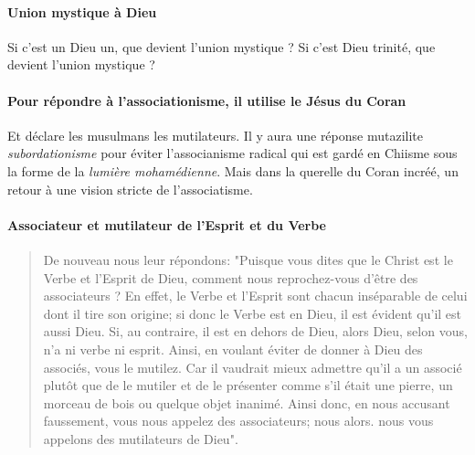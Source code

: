 \paragraph{Union mystique à Dieu} Si c'est un Dieu un, que devient l'union mystique ? Si c'est Dieu trinité, que devient l'union mystique ?

\paragraph{Pour répondre à l'associationisme, il utilise le Jésus du Coran} Et déclare les musulmans les mutilateurs. Il y aura une réponse mutazilite \textit{subordationisme} pour éviter l'associanisme radical qui est gardé en Chiisme sous la forme de la \textit{lumière mohamédienne}. Mais dans la querelle du Coran incréé, un retour à une vision stricte de l'associatisme.


\paragraph{Associateur et mutilateur de l'Esprit et du Verbe}
\begin{quote}
De nouveau nous leur répondons: "Puisque vous dites que le Christ est le Verbe et l'Esprit de Dieu, comment nous reprochez-vous d'être des associateurs ? En effet, le Verbe et l'Esprit sont chacun inséparable de celui dont il tire son origine; si donc le Verbe est en Dieu, il est évident qu'il est aussi Dieu. Si, au contraire, il est en dehors de Dieu, alors Dieu, selon vous, n'a ni verbe ni esprit. Ainsi, en voulant éviter de donner à Dieu des associés, vous le mutilez. Car il vaudrait mieux admettre qu'il a un associé plutôt que de le mutiler et de le présenter comme s'il était une pierre, un morceau de bois ou quelque objet inanimé. Ainsi donc, en nous accusant faussement, vous nous appelez des associateurs; nous alors. nous vous appelons des mutilateurs de Dieu".
\end{quote}
